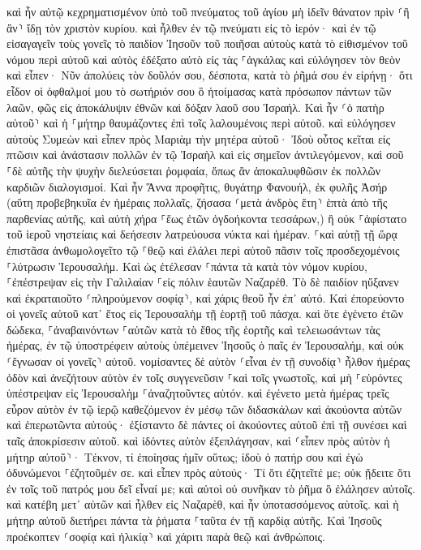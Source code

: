 \documentclass[twoside, 9pt]{extreport}
\begin{document}
καὶ ἦν αὐτῷ κεχρηματισμένον ὑπὸ τοῦ πνεύματος τοῦ ἁγίου μὴ ἰδεῖν θάνατον πρὶν ⸂ἢ ἂν⸃ ἴδῃ τὸν χριστὸν κυρίου. 
καὶ ἦλθεν ἐν τῷ πνεύματι εἰς τὸ ἱερόν· καὶ ἐν τῷ εἰσαγαγεῖν τοὺς γονεῖς τὸ παιδίον Ἰησοῦν τοῦ ποιῆσαι αὐτοὺς κατὰ τὸ εἰθισμένον τοῦ νόμου περὶ αὐτοῦ 
καὶ αὐτὸς ἐδέξατο αὐτὸ εἰς τὰς ⸀ἀγκάλας καὶ εὐλόγησεν τὸν θεὸν καὶ εἶπεν· 
Νῦν ἀπολύεις τὸν δοῦλόν σου, δέσποτα, κατὰ τὸ ῥῆμά σου ἐν εἰρήνῃ· 
ὅτι εἶδον οἱ ὀφθαλμοί μου τὸ σωτήριόν σου 
ὃ ἡτοίμασας κατὰ πρόσωπον πάντων τῶν λαῶν, 
φῶς εἰς ἀποκάλυψιν ἐθνῶν καὶ δόξαν λαοῦ σου Ἰσραήλ. 
Καὶ ἦν ⸂ὁ πατὴρ αὐτοῦ⸃ καὶ ἡ ⸀μήτηρ θαυμάζοντες ἐπὶ τοῖς λαλουμένοις περὶ αὐτοῦ. 
καὶ εὐλόγησεν αὐτοὺς Συμεὼν καὶ εἶπεν πρὸς Μαριὰμ τὴν μητέρα αὐτοῦ· Ἰδοὺ οὗτος κεῖται εἰς πτῶσιν καὶ ἀνάστασιν πολλῶν ἐν τῷ Ἰσραὴλ καὶ εἰς σημεῖον ἀντιλεγόμενον, 
καὶ σοῦ ⸀δὲ αὐτῆς τὴν ψυχὴν διελεύσεται ῥομφαία, ὅπως ἂν ἀποκαλυφθῶσιν ἐκ πολλῶν καρδιῶν διαλογισμοί. 
Καὶ ἦν Ἅννα προφῆτις, θυγάτηρ Φανουήλ, ἐκ φυλῆς Ἀσήρ (αὕτη προβεβηκυῖα ἐν ἡμέραις πολλαῖς, ζήσασα ⸂μετὰ ἀνδρὸς ἔτη⸃ ἑπτὰ ἀπὸ τῆς παρθενίας αὐτῆς, 
καὶ αὐτὴ χήρα ⸀ἕως ἐτῶν ὀγδοήκοντα τεσσάρων,) ἣ οὐκ ⸀ἀφίστατο τοῦ ἱεροῦ νηστείαις καὶ δεήσεσιν λατρεύουσα νύκτα καὶ ἡμέραν. 
⸀καὶ αὐτῇ τῇ ὥρᾳ ἐπιστᾶσα ἀνθωμολογεῖτο τῷ ⸀θεῷ καὶ ἐλάλει περὶ αὐτοῦ πᾶσιν τοῖς προσδεχομένοις ⸀λύτρωσιν Ἰερουσαλήμ. 
Καὶ ὡς ἐτέλεσαν ⸀πάντα τὰ κατὰ τὸν νόμον κυρίου, ⸀ἐπέστρεψαν εἰς τὴν Γαλιλαίαν ⸀εἰς πόλιν ἑαυτῶν Ναζαρέθ. 
Τὸ δὲ παιδίον ηὔξανεν καὶ ἐκραταιοῦτο ⸂πληρούμενον σοφίᾳ⸃, καὶ χάρις θεοῦ ἦν ἐπ᾽ αὐτό. 
Καὶ ἐπορεύοντο οἱ γονεῖς αὐτοῦ κατ᾽ ἔτος εἰς Ἰερουσαλὴμ τῇ ἑορτῇ τοῦ πάσχα. 
καὶ ὅτε ἐγένετο ἐτῶν δώδεκα, ⸀ἀναβαινόντων ⸀αὐτῶν κατὰ τὸ ἔθος τῆς ἑορτῆς 
καὶ τελειωσάντων τὰς ἡμέρας, ἐν τῷ ὑποστρέφειν αὐτοὺς ὑπέμεινεν Ἰησοῦς ὁ παῖς ἐν Ἰερουσαλήμ, καὶ οὐκ ⸂ἔγνωσαν οἱ γονεῖς⸃ αὐτοῦ. 
νομίσαντες δὲ αὐτὸν ⸂εἶναι ἐν τῇ συνοδίᾳ⸃ ἦλθον ἡμέρας ὁδὸν καὶ ἀνεζήτουν αὐτὸν ἐν τοῖς συγγενεῦσιν ⸀καὶ τοῖς γνωστοῖς, 
καὶ μὴ ⸀εὑρόντες ὑπέστρεψαν εἰς Ἰερουσαλὴμ ⸀ἀναζητοῦντες αὐτόν. 
καὶ ἐγένετο μετὰ ἡμέρας τρεῖς εὗρον αὐτὸν ἐν τῷ ἱερῷ καθεζόμενον ἐν μέσῳ τῶν διδασκάλων καὶ ἀκούοντα αὐτῶν καὶ ἐπερωτῶντα αὐτούς· 
ἐξίσταντο δὲ πάντες οἱ ἀκούοντες αὐτοῦ ἐπὶ τῇ συνέσει καὶ ταῖς ἀποκρίσεσιν αὐτοῦ. 
καὶ ἰδόντες αὐτὸν ἐξεπλάγησαν, καὶ ⸂εἶπεν πρὸς αὐτὸν ἡ μήτηρ αὐτοῦ⸃· Τέκνον, τί ἐποίησας ἡμῖν οὕτως; ἰδοὺ ὁ πατήρ σου καὶ ἐγὼ ὀδυνώμενοι ⸀ἐζητοῦμέν σε. 
καὶ εἶπεν πρὸς αὐτούς· Τί ὅτι ἐζητεῖτέ με; οὐκ ᾔδειτε ὅτι ἐν τοῖς τοῦ πατρός μου δεῖ εἶναί με; 
καὶ αὐτοὶ οὐ συνῆκαν τὸ ῥῆμα ὃ ἐλάλησεν αὐτοῖς. 
καὶ κατέβη μετ᾽ αὐτῶν καὶ ἦλθεν εἰς Ναζαρὲθ, καὶ ἦν ὑποτασσόμενος αὐτοῖς. καὶ ἡ μήτηρ αὐτοῦ διετήρει πάντα τὰ ῥήματα ⸀ταῦτα ἐν τῇ καρδίᾳ αὐτῆς. 
Καὶ Ἰησοῦς προέκοπτεν ⸂σοφίᾳ καὶ ἡλικίᾳ⸃ καὶ χάριτι παρὰ θεῷ καὶ ἀνθρώποις. 
\end{document}
